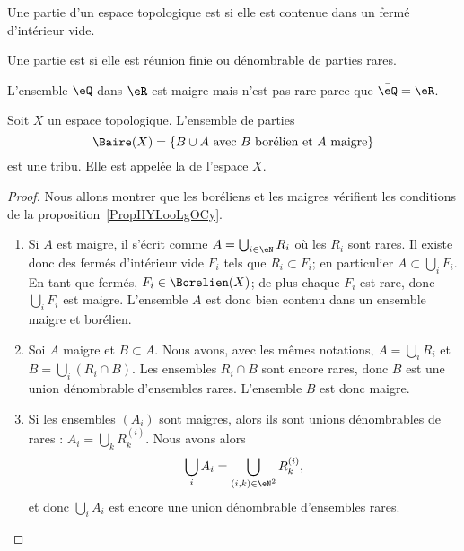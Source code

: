 \begin{definition}
    Une partie d'un espace topologique est  si elle est contenue dans un fermé d'intérieur vide.

    Une partie est  si elle est réunion finie ou dénombrable de parties rares.
\end{definition}

\begin{example}
    L'ensemble \( \eQ\) dans \( \eR\) est maigre mais n'est pas rare parce que \( \bar\eQ=\eR\).
\end{example}

\begin{proposition}
    Soit \( X\) un espace topologique. L'ensemble de parties
    \begin{equation}
        \Baire(X)=\{ B\cup A\text{ avec } B\text{ borélien et } A\text{ maigre} \}
    \end{equation}
    est une tribu. Elle est appelée la  de l'espace \( X\).
\end{proposition}

\begin{proof}
    Nous allons montrer que les boréliens et les maigres vérifient les conditions de la proposition~\ref{PropHYLooLgOCy}.
    \begin{enumerate}
        \item
            Si \( A\) est maigre, il s'écrit comme \( A=\bigcup_{i\in \eN}R_i\) où les \( R_i\) sont rares. Il existe donc des fermés d'intérieur vide \( F_i\) tels que \( R_i\subset F_i\); en particulier \( A\subset\bigcup_i F_i\). En tant que fermés, \( F_i\in\Borelien(X)\); de plus chaque \( F_i\) est rare, donc \( \bigcup_iF_i\) est maigre. L'ensemble \( A\) est donc bien contenu dans un ensemble maigre et borélien.
        \item
            Soi \( A\) maigre et \( B\subset A\). Nous avons, avec les mêmes notations, \( A=\bigcup_iR_i\) et \( B=\bigcup_i(R_i\cap B)\). Les ensembles \( R_i\cap B\) sont encore rares, donc \( B\) est une union dénombrable d'ensembles rares. L'ensemble \( B\) est donc maigre.
        \item
            Si les ensembles \( (A_i)\) sont maigres, alors ils sont unions dénombrables de rares : \( A_i=\bigcup_kR_k^{(i)}\). Nous avons alors
            \begin{equation}
                \bigcup_iA_i=\bigcup_{(i,k)\in \eN^2}R_k^{(i)},
            \end{equation}
            et donc \( \bigcup_iA_i\) est encore une union dénombrable d'ensembles rares.
    \end{enumerate}
\end{proof}

